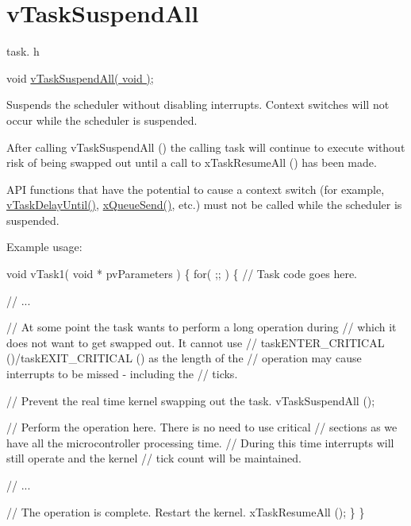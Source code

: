 \hypertarget{group__v_task_suspend_all}{}\section{v\+Task\+Suspend\+All}
\label{group__v_task_suspend_all}
task. h 
\begin{DoxyPre}void \hyperlink{task_8h_a366b302eba79d10b5ee2a3756f0fcc43}{vTaskSuspendAll( void )};\end{DoxyPre}


Suspends the scheduler without disabling interrupts. Context switches will not occur while the scheduler is suspended.

After calling v\+Task\+Suspend\+All () the calling task will continue to execute without risk of being swapped out until a call to x\+Task\+Resume\+All () has been made.

A\+PI functions that have the potential to cause a context switch (for example, \hyperlink{task_8h_a067da3e949e248096ec6c01f9cb75a47}{v\+Task\+Delay\+Until()}, \hyperlink{queue_8h_af7eb49d3249351176992950d9185abe9}{x\+Queue\+Send()}, etc.) must not be called while the scheduler is suspended.

Example usage\+: 
\begin{DoxyPre}
void vTask1( void * pvParameters )
\{
    for( ;; )
    \{
     // Task code goes here.\end{DoxyPre}



\begin{DoxyPre}     // ...\end{DoxyPre}



\begin{DoxyPre}     // At some point the task wants to perform a long operation during
     // which it does not want to get swapped out.  It cannot use
     // taskENTER\_CRITICAL ()/taskEXIT\_CRITICAL () as the length of the
     // operation may cause interrupts to be missed - including the
     // ticks.\end{DoxyPre}



\begin{DoxyPre}     // Prevent the real time kernel swapping out the task.
     vTaskSuspendAll ();\end{DoxyPre}



\begin{DoxyPre}     // Perform the operation here.  There is no need to use critical
     // sections as we have all the microcontroller processing time.
     // During this time interrupts will still operate and the kernel
     // tick count will be maintained.\end{DoxyPre}



\begin{DoxyPre}     // ...\end{DoxyPre}



\begin{DoxyPre}     // The operation is complete.  Restart the kernel.
     xTaskResumeAll ();
    \}
\}
  \end{DoxyPre}
 